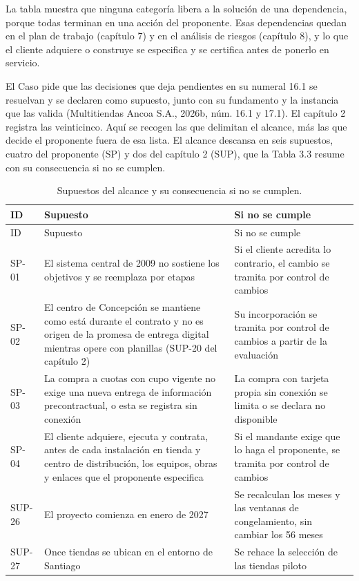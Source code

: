 \documentclass[11pt]{article}
\begin{document}
La tabla muestra que ninguna categoría libera a la solución de una dependencia, porque todas terminan en una acción del proponente. Esas dependencias quedan en el plan de trabajo (capítulo 7) y en el análisis de riesgos (capítulo 8), y lo que el cliente adquiere o construye se especifica y se certifica antes de ponerlo en servicio.

El Caso pide que las decisiones que deja pendientes en su numeral 16.1 se resuelvan y se declaren como supuesto, junto con su fundamento y la instancia que las valida (Multitiendas Ancoa S.A., 2026b, núm. 16.1 y 17.1). El capítulo 2 registra las veinticinco. Aquí se recogen las que delimitan el alcance, más las que decide el proponente fuera de esa lista. El alcance descansa en seis supuestos, cuatro del proponente (SP) y dos del capítulo 2 (SUP), que la Tabla 3.3 resume con su consecuencia si no se cumplen.

\begin{longtable}[]{@{}
  >{\raggedright\arraybackslash}p{}
  >{\raggedright\arraybackslash}p{}
  >{\raggedright\arraybackslash}p{}@{}}
\caption{Supuestos del alcance y su consecuencia si no se cumplen.}\label{tab:3-3}\\
\toprule\noalign{}
ID & Supuesto & Si no se cumple \\
\midrule\noalign{}
\endfirsthead
\toprule\noalign{}
ID & Supuesto & Si no se cumple \\
\midrule\noalign{}
\endhead
\bottomrule\noalign{}
\endlastfoot
SP-01 & El sistema central de 2009 no sostiene los objetivos y se reemplaza por etapas & Si el cliente acredita lo contrario, el cambio se tramita por control de cambios \\
SP-02 & El centro de Concepción se mantiene como está durante el contrato y no es origen de la promesa de entrega digital mientras opere con planillas (SUP-20 del capítulo 2) & Su incorporación se tramita por control de cambios a partir de la evaluación \\
SP-03 & La compra a cuotas con cupo vigente no exige una nueva entrega de información precontractual, o esta se registra sin conexión & La compra con tarjeta propia sin conexión se limita o se declara no disponible \\
SP-04 & El cliente adquiere, ejecuta y contrata, antes de cada instalación en tienda y centro de distribución, los equipos, obras y enlaces que el proponente especifica & Si el mandante exige que lo haga el proponente, se tramita por control de cambios \\
SUP-26 & El proyecto comienza en enero de 2027 & Se recalculan los meses y las ventanas de congelamiento, sin cambiar los 56 meses \\
SUP-27 & Once tiendas se ubican en el entorno de Santiago & Se rehace la selección de las tiendas piloto \\
\end{longtable}
\end{document}
